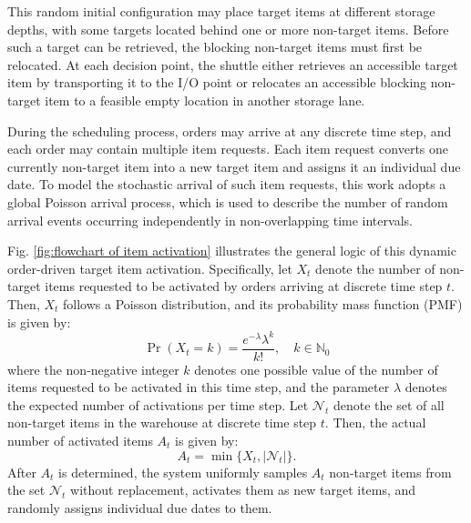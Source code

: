 This random initial configuration may place target items at different storage depths, with some targets located behind one or more non-target items. Before such a target can be retrieved, the blocking non-target items must first be relocated. At each decision point, the shuttle either retrieves an accessible target item by transporting it to the I/O point or relocates an accessible blocking non-target item to a feasible empty location in another storage lane.

During the scheduling process, orders may arrive at any discrete time step, and each order may contain multiple item requests. Each item request converts one currently non-target item into a new target item and assigns it an individual due date. To model the stochastic arrival of such item requests, this work adopts a global Poisson arrival process, which is used to describe the number of random arrival events occurring independently in non-overlapping time intervals. 

Fig. \ref{fig:flowchart of item activation} illustrates the general logic of this dynamic order-driven target item activation. Specifically, let $X_t$ denote the number of non-target items requested to be activated by orders arriving at discrete time step $t$. Then, $X_t$ follows a Poisson distribution, and its probability mass function (PMF) is given by:
\begin{equation}
\Pr(X_t=k)=\frac{e^{-\lambda}\lambda^k}{k!}, \quad k \in \mathbb{N}_{0}
\end{equation}
where the non-negative integer $k$ denotes one possible value of the number of items requested to be activated in this time step, and the parameter $\lambda$ denotes the expected number of activations per time step. Let $\mathcal{N}_t$ denote the set of all non-target items in the warehouse at discrete time step $t$. Then, the actual number of activated items $A_t$ is given by:
\begin{equation}
A_t=\min\{X_t,|\mathcal{N}_t|\}.
\end{equation}
After $A_t$ is determined, the system uniformly samples $A_t$ non-target items from the set $\mathcal{N}_t$ without replacement, activates them as new target items, and randomly assigns individual due dates to them.  

